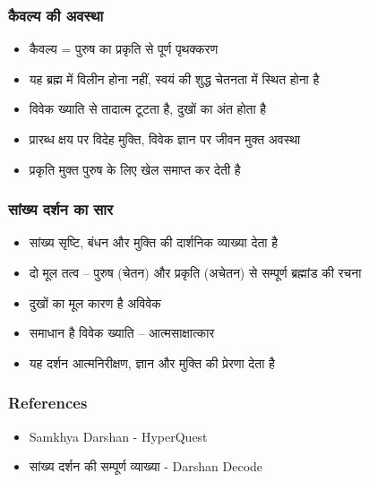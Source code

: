\begin{frame}[fragile]\frametitle{कैवल्य की अवस्था}
\begin{itemize}
  \item कैवल्य = पुरुष का प्रकृति से पूर्ण पृथक्करण
  \item यह ब्रह्म में विलीन होना नहीं, स्वयं की शुद्ध चेतनता में स्थित होना है
  \item विवेक ख्याति से तादात्म टूटता है, दुखों का अंत होता है
  \item प्रारब्ध क्षय पर विदेह मुक्ति, विवेक ज्ञान पर जीवन मुक्त अवस्था
  \item प्रकृति मुक्त पुरुष के लिए खेल समाप्त कर देती है
\end{itemize}
\end{frame}

\begin{frame}[fragile]\frametitle{सांख्य दर्शन का सार}
\begin{itemize}
  \item सांख्य सृष्टि, बंधन और मुक्ति की दार्शनिक व्याख्या देता है
  \item दो मूल तत्व – पुरुष (चेतन) और प्रकृति (अचेतन) से सम्पूर्ण ब्रह्मांड की रचना
  \item दुखों का मूल कारण है अविवेक
  \item समाधान है विवेक ख्याति – आत्मसाक्षात्कार
  \item यह दर्शन आत्मनिरीक्षण, ज्ञान और मुक्ति की प्रेरणा देता है
\end{itemize}
\end{frame}



\begin{frame}[fragile]\frametitle{References}

      \begin{itemize}
        \item Samkhya Darshan - HyperQuest
		\item सांख्य दर्शन की सम्पूर्ण व्याख्या - Darshan Decode
      \end{itemize}

\end{frame}


